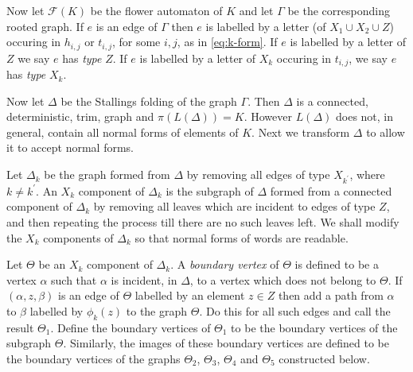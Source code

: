 \documentclass[a4paper,12pt]{article}
\renewcommand{\a}{\alpha }
\renewcommand{\b}{\beta }
\newcommand{\G}{\Gamma }
\newcommand{\D}{\Delta }
\newcommand{\T}{\Theta }
\newcommand{\cF}{{\cal{F}}}
\newtheorem{exam}[theorem]{Example}
\newenvironment{example}{\begin{exam} \rm}{\end{exam}}
\numberwithin{equation}{section}
\numberwithin{figure}{section}
\renewcommand{\cF}{\mathcal{F}}
\begin{document}
\begin{comment}
~\\
({\bf This is not quite clear, because it needs to be established
that colouring of a Stallings folding of $\G$ is not dependent on
the order of folding. It would be enough to show that the morphism
from $\G$ to $S(\G)$ is uniquely determined by $\G$, but I haven't
checked this out.}}{\ef It seems to be true, but I didn't check it
out properly yet.})
\begin{example}

Figure \ref{fig:dc-graphb} shows the Stallings folding of the graph of
Example \ref{ex:dc-graph}. Colours are shown only where the folding changes them.
\end{example}
\end{comment}
%
%


Now let $\cF(K)$ be the flower automaton of $K$ and let
$\G$ be the corresponding rooted graph. If $e$ is an edge of $\G$ then
$e$ is labelled by a letter (of $X_1\cup X_2 \cup Z$)
occuring in $h_{i,j}$ or $t_{i,j}$, for some $i,j$, as in
\eqref{eq:k-form}. If $e$ is labelled by a letter of $Z$ we say $e$ has {\em type} $Z$.
If $e$ is labelled by a letter of $X_k$ occuring in
$t_{i,j}$, we say $e$ has {\em type} $X_k$.

Now let $\D$ be the Stallings folding of the graph $\G$.  Then
 $\D$ is a connected, deterministic, trim, graph and $\pi(L(\D))=K$. However
$L(\D)$ does not, in general, contain all normal forms of elements of $K$.
Next we transform $\D$ to allow it to accept normal forms.


Let $\D_k$ be the graph formed from $\D$ by removing all edges of
type $X_{k^\prime}$, where $k\neq k^\prime$. An $X_k$ component of
$\D_k$ is the subgraph of $\D$ formed from a connected component
of $\D_k$ by removing all leaves which are incident to edges of
type $Z$, and then repeating the process till there are no such
leaves left.
 We shall modify the $X_k$ components of $\D_k$ so that normal forms of words
are readable.

Let $\T$ be an $X_k$ component of $\D_k$. A
{\em boundary vertex} of $\T$ is defined to be a vertex
$\a$ such that $\a$ is incident, in $\D$, to a vertex which does not
belong to $\T$.  If $(\a,z,\b)$ is an edge of
$\T$ labelled by an element $z\in Z$ then add a path from $\a$ to
$\b$ labelled by $\phi_k(z)$ to the graph $\T$. Do this for all such edges
and call the result $\T_1$.  Define the boundary vertices of $\T_1$ to be
the boundary vertices of the subgraph $\T$. Similarly, the images of these
boundary vertices are defined to be the boundary vertices of
the graphs $\T_2$, $\T_3$, $\T_4$ and $\T_5$ constructed
below.
\end{document}
